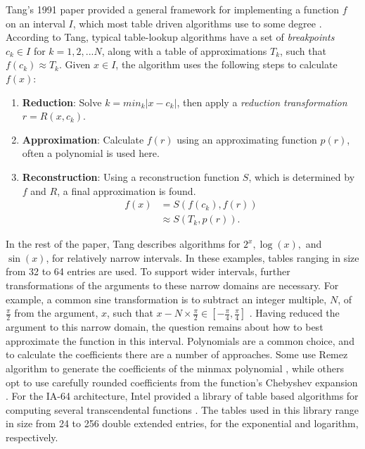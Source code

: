 \documentclass{fac}
\newcommand{\abs}[1]{\lvert#1\rvert}
\begin{document}
Tang's 1991 paper provided a general framework for implementing a function $f$ on an interval $I$, which most table driven algorithms use to some degree \cite{tang1991table}. According to Tang, typical table-lookup algorithms have a set of \textit{breakpoints} $c_k \in I$ for $k=1, 2, ... N$, along with a table of approximations $T_k$, such that $f(c_k) \approx T_k$. Given $x \in I$, the algorithm uses the following steps to calculate $f(x)$:
\begin{enumerate}

\item \textbf{Reduction}: Solve $k = min_k \abs{x-c_k}$, then apply a \textit{reduction transformation} $r = R(x,c_k)$.

\item \textbf{Approximation}: Calculate $f(r)$ using an approximating function $p(r)$, often a polynomial is used here.

\item \textbf{Reconstruction}: Using a reconstruction function $S$, which is determined by $f$ and $R$, a final approximation is found.
\begin{align*}
    f(x) &= S(f(c_k),f(r)) \\
         &\approx S(T_k,p(r)).
\end{align*}

\end{enumerate} 

In the rest of the paper, Tang describes algorithms for $2^x, \log(x),$ and $\sin{(x)}$, for relatively narrow intervals. In these examples, tables ranging in size from 32 to 64 entries are used. To support wider intervals, further transformations of the arguments to these narrow domains are necessary. For example, a common sine transformation is to subtract an integer multiple, $N$, of $\frac{\pi}{2}$ from the argument, $x$, such that $x-N \times \frac{\pi}{2} \in [-\frac{\pi}{4}, \frac{\pi}{4}]$ \cite{harrison2006floating,harrison2000formal}. Having reduced the argument to this narrow domain, the question remains about how to best approximate the function in this interval. Polynomials are a common choice, and to calculate the coefficients there are a number of approaches. Some use Remez algorithm to generate the coefficients of the minmax polynomial \cite{veidinger1960numerical,tang1991table}, while others opt to use carefully rounded coefficients from the function's Chebyshev expansion \cite{378099}. For the IA-64 architecture, Intel provided a library of table based algorithms for computing several transcendental functions \cite{harrison1999computation}. The tables used in this library range in size from 24 to 256 double extended entries, for the exponential and logarithm, respectively.
\end{document}
